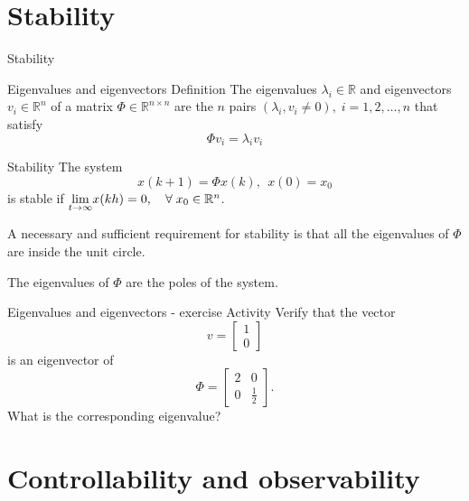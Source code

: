 \documentclass[presentation,aspectratio=1610]{beamer}
\begin{document}
\section{Stability}
\label{sec:orgd7bcbae}
\begin{frame}[label={sec:org67bf27a}]{Stability}
\end{frame}
\begin{frame}[label={sec:orgbe68e19}]{Eigenvalues and eigenvectors}
\alert{Definition} The eigenvalues \(\lambda_i  \in \mathbb{R}\) and eigenvectors \(v_i \in \mathbb{R}^n\) of a matrix \(\Phi \in \mathbb{R}^{n\times{}n}\) are the \(n\) pairs \((\lambda_i, v_i \neq 0 ), \; i=1,2,\ldots,n\) that satisfy
\[ \Phi v_i = \lambda_i v_i \]
\end{frame}

\begin{frame}[label={sec:org28643b7}]{Stability}
The system
\begin{equation*}
x(k+1)=\Phi x(k), \ \ x(0)=x_0
\end{equation*}
is \alert{stable} if  \(\underset{t\to\infty}{\lim}x(kh)=0, \quad \forall\;  x_0\in\Bbb{R}^n\).

A necessary and sufficient requirement for stability is that \alert{all the eigenvalues of \(\Phi\) are inside the unit circle.}

The \alert{eigenvalues} of \(\Phi\) are the  \alert{poles} of the system.
\end{frame}

\begin{frame}[label={sec:org49e757d}]{Eigenvalues and eigenvectors - exercise}
\alert{Activity} Verify that the vector
\[ v = \begin{bmatrix}1\\0\end{bmatrix}\]
is an eigenvector of
\[ \Phi = \begin{bmatrix} 2 & 0\\0 & \frac{1}{2} \end{bmatrix}. \]
What is the corresponding eigenvalue?
\end{frame}

\section{Controllability and observability}
\label{sec:org9bb04e3}
\end{document}
